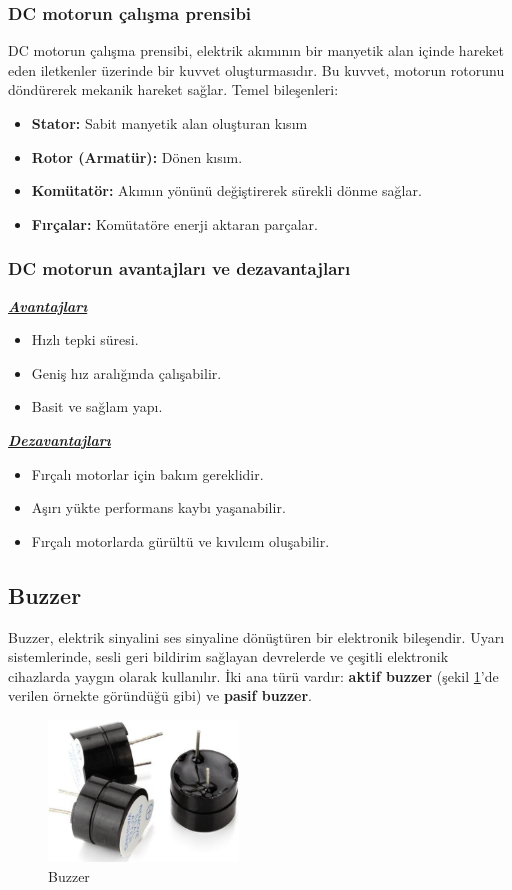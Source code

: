 \subsubsection{DC motorun çalışma prensibi}
    DC motorun çalışma prensibi, elektrik akımının bir manyetik alan içinde hareket eden iletkenler üzerinde bir kuvvet oluşturmasıdır. Bu kuvvet, motorun rotorunu döndürerek mekanik hareket sağlar. Temel bileşenleri:
\begin{itemize}   
\item \textbf{Stator:} Sabit manyetik alan oluşturan kısım
\item \textbf{Rotor (Armatür):} Dönen kısım.
\item \textbf{Komütatör:} Akımın yönünü değiştirerek sürekli dönme sağlar.
\item \textbf{Fırçalar:} Komütatöre enerji aktaran parçalar.
\end{itemize}

\subsubsection{DC motorun avantajları ve dezavantajları}
\par\textbf{\textit{\underline{Avantajları}}}
\begin{itemize}   
\item Hızlı tepki süresi.
\item Geniş hız aralığında çalışabilir.
\item Basit ve sağlam yapı.
\end{itemize}
\par\textbf{\textit{\underline{Dezavantajları}}}
\begin{itemize}   
\item Fırçalı motorlar için bakım gereklidir.
\item Aşırı yükte performans kaybı yaşanabilir.
\item Fırçalı motorlarda gürültü ve kıvılcım oluşabilir.
\end{itemize}

\subsection{Buzzer}

    Buzzer, elektrik sinyalini ses sinyaline dönüştüren bir elektronik bileşendir. Uyarı sistemlerinde, sesli geri bildirim sağlayan devrelerde ve çeşitli elektronik cihazlarda yaygın olarak kullanılır. İki ana türü vardır: \textbf{aktif buzzer} (şekil \ref{fig:23}'de verilen örnekte göründüğü gibi) ve \textbf{pasif buzzer}.
\begin{figure}[H]
\centering
\includegraphics[width=0.45\textwidth]{Resimler/23.png}
\caption{Buzzer}
\label{fig:23}
\end{figure}

